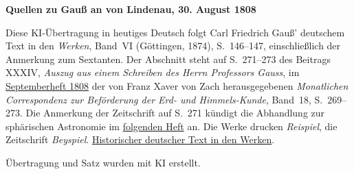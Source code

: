\clearpage\thispagestyle{empty}
\begin{center}\textbf{Quellen zu Gauß an von Lindenau, 30. August 1808}\end{center}
\noindent Diese KI-Übertragung in heutiges Deutsch folgt Carl Friedrich Gauß’ deutschem Text in den \textit{Werken}, Band~VI (Göttingen, 1874), S.~146--147, einschließlich der Anmerkung zum Sextanten. Der Abschnitt steht auf S.~271--273 des Beitrags XXXIV, \textit{Auszug aus einem Schreiben des Herrn Professors Gauss}, im \href{https://www.digitale-sammlungen.de/en/view/bsb10538609?page=293}{Septemberheft 1808} der von Franz Xaver von Zach herausgegebenen \textit{Monatlichen Correspondenz zur Beförderung der Erd- und Himmels-Kunde}, Band~18, S.~269--273. Die Anmerkung der Zeitschrift auf S.~271 kündigt die Abhandlung zur sphärischen Astronomie im \href{https://www.digitale-sammlungen.de/en/view/bsb10538609?page=299}{folgenden Heft} an. Die Werke drucken \textit{Reispiel}, die Zeitschrift \textit{Beyspiel}. \href{https://gdz.sub.uni-goettingen.de/id/PPN236007467}{Historischer deutscher Text in den Werken}.
\par\smallskip\noindent Übertragung und Satz wurden mit KI erstellt.
\clearpage

